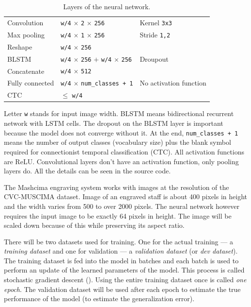 \begin{table}[h]
\begin{tabular}{lll}
Convolution & \texttt{w/4} $\times$ \texttt{2} $\times$ \texttt{256} & Kernel \texttt{3x3} \\
Max pooling & \texttt{w/4} $\times$ \texttt{1} $\times$ \texttt{256} & Stride \texttt{1,2} \\
\midrule
Reshape & \texttt{w/4} $\times$ \texttt{256} & \\
BLSTM & \texttt{w/4} $\times$ \texttt{256} $+$ \texttt{w/4} $\times$ \texttt{256} & Droupout \\
Concatenate & \texttt{w/4} $\times$ \texttt{512} & \\
\midrule
Fully connected & \texttt{w/4} $\times$ \verb`num_classes + 1` & No activation function \\
CTC & $\leq$ \texttt{w/4} & \\
\bottomrule
\end{tabular}
\caption{Layers of the neural network.}
\label{tab6:NetworkLayers}
\medskip
\small
Letter \texttt{w} stands for input image width. BLSTM means bidirectional recurrent network with LSTM cells. The dropout on the BLSTM layer is important because the model does not converge without it. At the end, \verb`num_classes + 1` means the number of output classes (vocabulary size) plus the blank symbol required for connectionist temporal classification (CTC). All activation functions are ReLU. Convolutional layers don't have an activation function, only pooling layers do. All the details can be  seen in the source code.
\end{table}

The Mashcima engraving system works with images at the resolution of the CVC-MUSCIMA dataset. Image of an engraved staff is about 400 pixels in height and the width varies from 500 to over 2000 pixels. The neural network however requires the input image to be exactly 64 pixels in height. The image will be scaled down because of this while preserving its aspect ratio.

There will be two datasets used for training. One for the actual training --- a \emph{training dataset} and one for validation --- a \emph{validation dataset} (or \emph{dev dataset}). The training dataset is fed into the model in batches and each batch is used to perform an update of the learned parameters of the model. This process is called stochastic gradient descent (\cite{Goodfellow-et-al-2016}). Using the entire training dataset once is called \emph{one epoch}. The validation dataset will be used after each epoch to estimate the true performance of the model (to estimate the generalization error).


